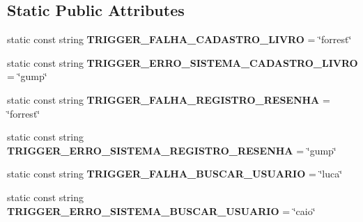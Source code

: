 \subsection*{Static Public Attributes}
\begin{DoxyCompactItemize}
\item 
\mbox{\label{classSTUBComandosusuarioautenticado_a6130917026c71c1c20d2aee41ab916a8}} 
static const string {\bfseries T\+R\+I\+G\+G\+E\+R\+\_\+\+F\+A\+L\+H\+A\+\_\+\+C\+A\+D\+A\+S\+T\+R\+O\+\_\+\+L\+I\+V\+RO} = \char`\"{}forrest\char`\"{}
\item 
\mbox{\label{classSTUBComandosusuarioautenticado_a07ca908a055324beeb90eab1f3926933}} 
static const string {\bfseries T\+R\+I\+G\+G\+E\+R\+\_\+\+E\+R\+R\+O\+\_\+\+S\+I\+S\+T\+E\+M\+A\+\_\+\+C\+A\+D\+A\+S\+T\+R\+O\+\_\+\+L\+I\+V\+RO} = \char`\"{}gump\char`\"{}
\item 
\mbox{\label{classSTUBComandosusuarioautenticado_a5b1058157df116b390a06c1f802b8c3b}} 
static const string {\bfseries T\+R\+I\+G\+G\+E\+R\+\_\+\+F\+A\+L\+H\+A\+\_\+\+R\+E\+G\+I\+S\+T\+R\+O\+\_\+\+R\+E\+S\+E\+N\+HA} = \char`\"{}forrest\char`\"{}
\item 
\mbox{\label{classSTUBComandosusuarioautenticado_a9f46bca32f1eb4d9efdf336f63c40397}} 
static const string {\bfseries T\+R\+I\+G\+G\+E\+R\+\_\+\+E\+R\+R\+O\+\_\+\+S\+I\+S\+T\+E\+M\+A\+\_\+\+R\+E\+G\+I\+S\+T\+R\+O\+\_\+\+R\+E\+S\+E\+N\+HA} = \char`\"{}gump\char`\"{}
\item 
\mbox{\label{classSTUBComandosusuarioautenticado_aaf54abf3405c0feca3ebc1130ed2d9ae}} 
static const string {\bfseries T\+R\+I\+G\+G\+E\+R\+\_\+\+F\+A\+L\+H\+A\+\_\+\+B\+U\+S\+C\+A\+R\+\_\+\+U\+S\+U\+A\+R\+IO} = \char`\"{}luca\char`\"{}
\item 
\mbox{\label{classSTUBComandosusuarioautenticado_ab9d312722af5596334113f2afea9646d}} 
static const string {\bfseries T\+R\+I\+G\+G\+E\+R\+\_\+\+E\+R\+R\+O\+\_\+\+S\+I\+S\+T\+E\+M\+A\+\_\+\+B\+U\+S\+C\+A\+R\+\_\+\+U\+S\+U\+A\+R\+IO} = \char`\"{}caio\char`\"{}
\item 
\mbox{\label{classSTUBComandosusuarioautenticado_a55a441d1b1a4c579d028f23eb9fe6611}} 

\end{DoxyCompactItemize}
